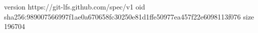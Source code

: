 version https://git-lfs.github.com/spec/v1
oid sha256:989007566997f1ae0a670658fc30250e81d1ffe50977ea457f22e6098113f076
size 196704
